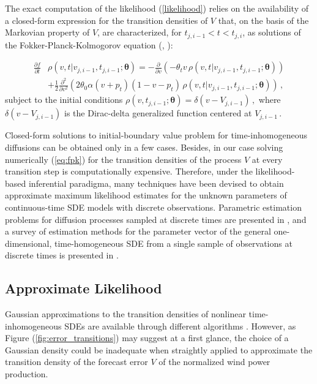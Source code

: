 \documentclass[11pt]{article}
\theoremstyle{definition}
\begin{document}
The exact computation of the likelihood (\ref{likelihood}) relies on the availability of a closed-form expression for the transition densities of $V$ that, on the basis of the Markovian property of $V$, are characterized, for $ t_{j, i-1} < t < t_{j,i}$,  as solutions of the Fokker-Planck-Kolmogorov equation (\cite[36]{iacus1}, \cite[61-68]{saso}):

\begin{align}
\frac{ \partial f }{\partial t } & \rho(v ,t \vert v_{j,i-1} ,  t_{j,i-1} ; \bm{\theta} )= - \frac{\partial}{ \partial v} (- \theta_t v \, \rho(v ,t \vert v_{j,i-1} ,  t_{j,i-1} ; \bm{\theta} ) ) \nonumber \\
& + \frac{1}{2} \frac{\partial^2}{ \partial v^2} ( 2 \theta_0 \alpha (v+ p_t) (1 - v- p_t) \, \rho(v ,t \vert v_{j,i-1} ,  t_{j,i-1} ; \bm{\theta} ) )\,,  \label{eq:fpk}
\end{align}
subject to the initial conditions $\rho(v , t_{j, i-1} ; \bm{\theta} ) = \delta(v - V_{j, i-1}) \,,$ where $ \delta(v - V_{j, i-1})$ is the Dirac-delta generalized function centered at $ V_{j, i-1}\,.$

Closed-form solutions to initial-boundary value problem for time-in\-ho\-mo\-geneous diffusions can be obtained only in a few cases. Besides, in our case solving numerically (\ref{eq:fpk}) for the transition densities of the process $V$ at every transition step is computationally expensive. 
Therefore, under the likelihood-based inferential paradigma, many techniques have been devised to obtain approximate maximum likelihood estimates for the unknown parameters of continuous-time SDE models with discrete observations. Parametric estimation problems for diffusion processes sampled at discrete times are presented in \autocite[Chapter 3]{iacus1}, and a survey of estimation methods for the parameter vector of the general one-dimensional, time-homogeneous SDE from a single sample of observations at discrete times is presented in \autocite{hurn}.

\subsection{Approximate Likelihood}

Gaussian approximations to the transition densities of nonlinear time-in\-ho\-mo\-geneous SDEs are available through different algorithms  \autocite[Chapter 9]{saso}. However, as Figure (\ref{fig:error_transitions}) may suggest at a first glance, the choice of a Gaussian density could be inadequate when straightly applied to approximate the transition density of the forecast error $V$ of the normalized wind power production. 
\end{document}
